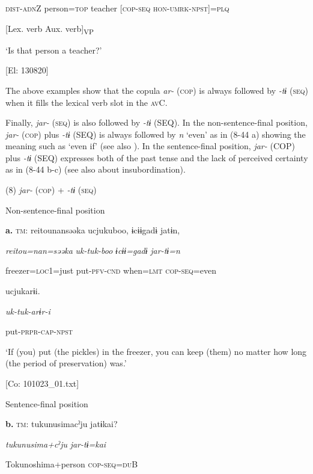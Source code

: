       \textsc{dist}-\textsc{adn}Z  person=\textsc{top}  teacher  [\textsc{cop}-\textsc{seq}  \textsc{hon}-\textsc{umrk}-\textsc{npst}]=\textsc{plq}

            [Lex. verb  Aux. verb]\textsubscript{VP}

      ‘Is that person a teacher?’

      [El: 130820]

The above examples show that the copula \textit{ar-} (\textsc{cop}) is always followed by \textit{{}-tɨ} (\textsc{seq}) when it fills the lexical verb slot in the \textsc{av}C.

  Finally, \textit{jar-} (\textsc{seq}) is also followed by \textit{{}-tɨ} (SEQ). In the non-sentence-final position, \textit{jar-} (\textsc{cop}) plus \textit{{}-tɨ} (SEQ) is always followed by \textit{n} ‘even’ as in (8-44 a) showing the meaning such as ‘even if’ (see also ). In the sentence-final position, \textit{jar-} (COP) plus \textit{{}-tɨ} (SEQ) expresses both of the past tense and the lack of perceived certainty as in (8-44 b-c) (see also  about insubordination).

(8)  \textit{jar-} (\textsc{cop}) + \textit{{}-tɨ} (\textsc{seq})

  Non-sentence-final position

  \textbf{a.}  \textsc{tm}:  {\textbar}reitou{\textbar}nansəəka  ucjukuboo,  ɨcɨɨgadɨ  jatɨn,

      \textit{reitou=nan=səəka}  \textit{uk-tuk-boo}  \textit{ɨcɨɨ=gadɨ}  \textit{jar-tɨ=n}

      freezer=\textsc{loc}1=just  put-\textsc{pfv}-\textsc{cnd}  when=\textsc{lmt}  \textsc{cop}-\textsc{seq}=even

      ucjukarɨi.

      \textit{uk-tuk-arɨr-i}

      put-\textsc{prpr}-\textsc{cap}-\textsc{npst}

      ‘If (you) put (the pickles) in the freezer, you can keep (them) no matter how long (the period of preservation) was.’

      [Co: 101023\_01.txt]

  Sentence-final position

  \textbf{b.}  \textsc{tm}:  tukunusimacˀju  jatɨkai?

      \textit{tukunusima+cˀju}  \textit{jar-tɨ=kai}

      Tokunoshima+person  \textsc{cop}-\textsc{seq}=\textsc{du}B

